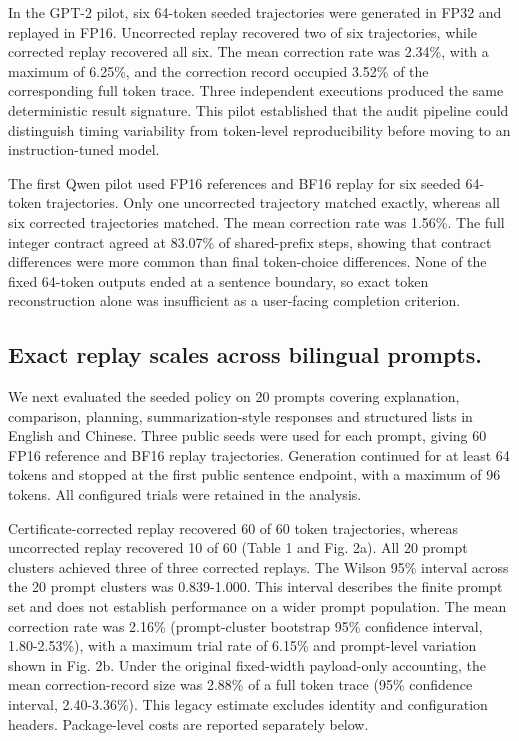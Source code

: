 \documentclass{nature}
\begin{document}
In the GPT-2 pilot, six 64-token seeded trajectories were generated in FP32 and replayed in FP16. Uncorrected replay recovered two of six trajectories, while corrected replay recovered all six. The mean correction rate was 2.34\%, with a maximum of 6.25\%, and the correction record occupied 3.52\% of the corresponding full token trace. Three independent executions produced the same deterministic result signature. This pilot established that the audit pipeline could distinguish timing variability from token-level reproducibility before moving to an instruction-tuned model.

The first Qwen pilot used FP16 references and BF16 replay for six seeded 64-token trajectories. Only one uncorrected trajectory matched exactly, whereas all six corrected trajectories matched. The mean correction rate was 1.56\%. The full integer contract agreed at 83.07\% of shared-prefix steps, showing that contract differences were more common than final token-choice differences. None of the fixed 64-token outputs ended at a sentence boundary, so exact token reconstruction alone was insufficient as a user-facing completion criterion.

\subsection{Exact replay scales across bilingual prompts.}
We next evaluated the seeded policy on 20 prompts covering explanation, comparison, planning, summarization-style responses and structured lists in English and Chinese. Three public seeds were used for each prompt, giving 60 FP16 reference and BF16 replay trajectories. Generation continued for at least 64 tokens and stopped at the first public sentence endpoint, with a maximum of 96 tokens. All configured trials were retained in the analysis.

Certificate-corrected replay recovered 60 of 60 token trajectories, whereas uncorrected replay recovered 10 of 60 (Table 1 and Fig. 2a). All 20 prompt clusters achieved three of three corrected replays. The Wilson 95\% interval across the 20 prompt clusters was 0.839-1.000. This interval describes the finite prompt set and does not establish performance on a wider prompt population. The mean correction rate was 2.16\% (prompt-cluster bootstrap 95\% confidence interval, 1.80-2.53\%), with a maximum trial rate of 6.15\% and prompt-level variation shown in Fig. 2b. Under the original fixed-width payload-only accounting, the mean correction-record size was 2.88\% of a full token trace (95\% confidence interval, 2.40-3.36\%). This legacy estimate excludes identity and configuration headers. Package-level costs are reported separately below.
\end{document}
